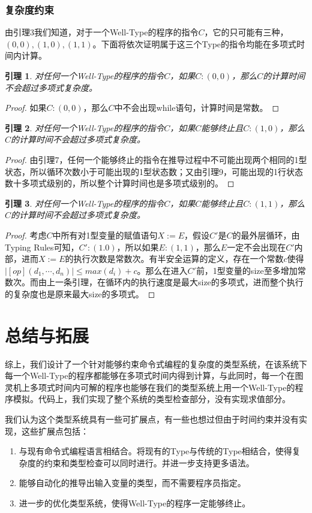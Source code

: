 \documentclass{ctexart}
\newtheorem{lemma}{引理}
\newtheorem{proof}{证明}
\begin{document}
\subsubsection{复杂度约束}
由引理3我们知道，对于一个Well-Type的程序的指令$C$，它的只可能有三种，$(0,0), (1,0), (1,1)$。下面将依次证明属于这三个Type的指令均能在多项式时间内计算。
\begin{lemma}
对任何一个Well-Type的程序的指令$C$，如果$C:(0,0)$，那么$C$的计算时间不会超过多项式复杂度。
\end{lemma}
\begin{proof}
如果$C:(0,0)$，那么$C$中不会出现while语句，计算时间是常数。
\end{proof}
\begin{lemma}
对任何一个Well-Type的程序的指令$C$，如果$C$能够终止且$C:(1,0)$，那么$C$的计算时间不会超过多项式复杂度。
\end{lemma}
\begin{proof}
由引理7，任何一个能够终止的指令在推导过程中不可能出现两个相同的1型状态，所以循环次数小于可能出现的1型状态数；又由引理9，可能出现的1行状态数十多项式级别的，所以整个计算时间也是多项式级别的。
\end{proof}
\begin{lemma}
对任何一个Well-Type的程序的指令$C$，如果$C$能够终止且$C:(1,1)$，那么$C$的计算时间不会超过多项式复杂度。
\end{lemma}
\begin{proof}
考虑$C$中所有对1型变量的赋值语句$X:=E$，假设$C'$是$C$的最外层循环，由Typing Rules可知，$C':(1.0)$，所以如果$E:(1,1)$，那么$E$一定不会出现在$C'$内部，进而$X:=E$的执行次数是常数次。有半安全运算的定义，存在一个常数$c$使得$|[op](d_1,\cdots,d_n)|\leqslant max(d_i)+c$。那么在进入$C'$前，1型变量的size至多增加常数次。而由上一条引理，在循环内的执行速度是最大size的多项式，进而整个执行的复杂度也是原来最大size的多项式。
\end{proof}

\section{总结与拓展}
综上，我们设计了一个针对能够约束命令式编程的复杂度的类型系统，在该系统下每一个Well-Type的程序都能够在多项式时间内得到计算，与此同时，每一个在图灵机上多项式时间内可解的程序也能够在我们的类型系统上用一个Well-Type的程序模拟。代码上，我们实现了整个系统的类型检查部分，没有实现求值部分。

我们认为这个类型系统具有一些可扩展点，有一些也想过但由于时间约束并没有实现，这些扩展点包括：
\begin{enumerate}
\item 与现有命令式编程语言相结合。将现有的Type与传统的Type相结合，使得复杂度的约束和类型检查可以同时进行。并进一步支持更多语法。
\item 能够自动化的推导出输入变量的类型，而不需要程序员指定。
\item 进一步的优化类型系统，使得Well-Type的程序一定能够终止。
\end{enumerate}
\end{document}
